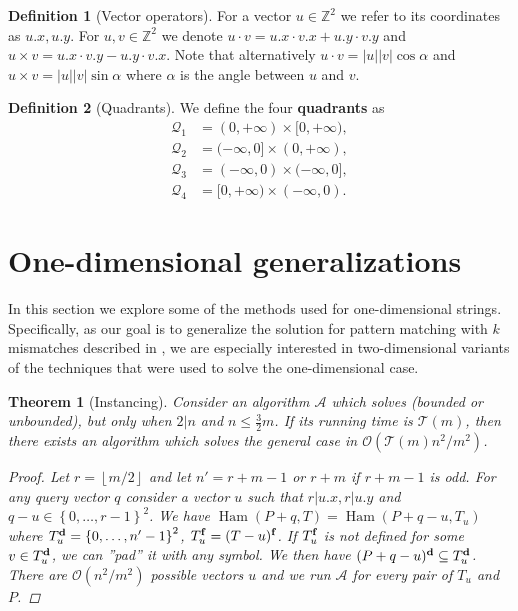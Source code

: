 \documentclass[11pt]{article}
\DeclareMathOperator*{\Ham}{Ham}
\newcommand{\Z}{\mathbb{Z}}
\renewcommand{\O}{\mathcal{O}}
\renewcommand{\phi}{\varphi}
\newcommand{\set}[1]{\left\lbrace #1 \right\rbrace}
\newcommand{\floor}[1]{\left\lfloor #1 \right\rfloor}
\newcommand{\eq}[1]{\begin{align*} #1 \end{align*}}
\theoremstyle{plain}
\newtheorem{theorem}{Theorem}
\theoremstyle{definition}
\newtheorem{definition}{Definition}
\theoremstyle{remark}
\begin{document}
\newcommand{\x}[1]{#1.x}
\newcommand{\y}[1]{#1.y}
\newcommand{\h}[1]{\phi \times #1}
\newcommand{\s}[1]{\psi \times #1}
\begin{definition}[Vector operators]
	For a vector $u \in \Z^2$ we refer to its coordinates as $\x{u}, \y{u}$.
	For $u, v \in \Z^2$ we denote $u \cdot v = \x{u} \cdot \x{v} + \y{u} \cdot \y{v}$
	and $u \times v = \x{u} \cdot \y{v} - \y{u} \cdot \x{v}$.
	Note that alternatively $u \cdot v = |u||v| \cos \alpha$ and $u \times v = |u||v| \sin \alpha$ where $\alpha$ is the angle between $u$ and $v$.
\end{definition}


\newcommand{\Q}{\mathcal{Q}}
\begin{definition}[Quadrants]
	We define the four \textbf{quadrants} as
	\eq{
		\Q_1 &= (0, +\infty) \times [0, +\infty), \\
		\Q_2 &= (-\infty, 0] \times (0, +\infty), \\
		\Q_3 &= (-\infty, 0) \times (-\infty, 0], \\
		\Q_4 &= [0, +\infty) \times (-\infty, 0).
	}
\end{definition}


\section{One-dimensional generalizations}
In this section we explore some of the methods used for one-dimensional strings.
Specifically, as our goal is to generalize the solution for pattern matching with $k$ mismatches described in \cite{Gawrychowski2017}, we are especially interested in two-dimensional variants of the techniques that were used to solve the one-dimensional case.


\begin{theorem}[Instancing]\label{instancing}
	Consider an algorithm $\mathcal{A}$ which solves \HD (bounded or unbounded), but only when $2|n$ and $n \le \frac{3}{2}m$.
	If its running time is $\mathcal{T}(m)$, then there exists an algorithm which solves the general case in $\O(\mathcal{T}(m) n^2 / m^2)$.
	\begin{proof}
		Let $r = \floor{m / 2}$ and let $n' = r + m - 1$ or $r + m$ if $r + m - 1$ is odd.
		For any query vector $q$ consider a vector $u$ such that $r|u.x, r|u.y$ and $q - u \in \set{0, \dots, r - 1}^2$.
		We have $\Ham(P + q, T) = \Ham(P + q - u, T_u)$ where $\d{T_u} = \set{0, \dots, n' - 1}^2$, $T_u^\mathbf{f} = (T - u)^\mathbf{f}$.
		If $T_u^\mathbf{f}$ is not defined for some $v \in T_u^\mathbf{d}$, we can ''pad'' it with any symbol.
		We then have $(P + q - u)^\mathbf{d} \subseteq T_u^\mathbf{d}$.
		There are $\O(n^2 / m^2)$ possible vectors $u$ and we run $\mathcal{A}$ for every pair of $T_u$ and $P$.
	\end{proof}
\end{theorem}
\end{document}
